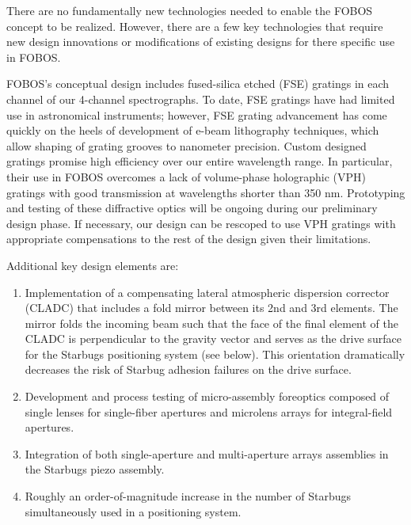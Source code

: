 \documentclass[oneside,11pt]{amsart}
\begin{document}

There are no fundamentally new technologies needed to enable the
FOBOS concept to be realized. However, there are a few key
technologies that require new design innovations or modifications of
existing designs for there specific use in FOBOS.



FOBOS's conceptual design includes fused-silica etched (FSE) gratings
in each channel of our 4-channel spectrographs. To date, FSE gratings
have had limited use in astronomical instruments; however, FSE
grating advancement has come quickly on the heels of development of
e-beam lithography techniques, which allow shaping of grating grooves
to nanometer precision. Custom designed gratings promise high
efficiency over our entire wavelength range. In particular, their use
in FOBOS overcomes a lack of volume-phase holographic (VPH) gratings
with good transmission at wavelengths shorter than 350 nm.
Prototyping and testing of these diffractive optics will be ongoing
during our preliminary design phase. If necessary, our design can be
rescoped to use VPH gratings with appropriate compensations to the
rest of the design given their limitations.

Additional key design elements are:
%
\begin{enumerate}
\item Implementation of a compensating lateral atmospheric dispersion
corrector (CLADC) that includes a fold mirror between its 2nd and 3rd
elements. The mirror folds the incoming beam such that the face of
the final element of the CLADC is perpendicular to the gravity vector
and serves as the drive surface for the Starbugs positioning system
(see below). This orientation dramatically decreases the risk of
Starbug adhesion failures on the drive surface.
\item Development and process testing of micro-assembly foreoptics
composed of single lenses for single-fiber apertures and microlens
arrays for integral-field apertures.
\item Integration of both single-aperture and multi-aperture arrays
assemblies in the Starbugs piezo assembly.
\item Roughly an order-of-magnitude increase in the number of Starbugs
simultaneously used in a positioning system.
\end{enumerate}
\end{document}
